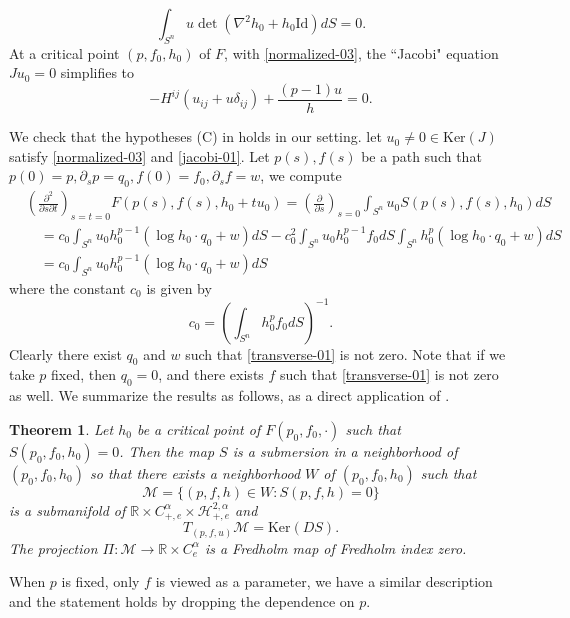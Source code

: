 \documentclass[reqno]{amsart}
\theoremstyle{remark}
\def\p{\partial}
\def\R{\mathbb{R}}
\def\cH{{\mathcal H}}
\def\cM{{\mathcal M}}
\theoremstyle{plain}
\newtheorem{thm}{Theorem}
\begin{document}
\begin{equation}\label{normalized-03}
\int_{S^n} u \det(\nabla^2 h_0+h_0\text{Id}) dS=0.
\end{equation}
At a critical point $(p, f_0, h_0)$ of $F$, with \eqref{normalized-03}, the ``Jacobi" equation $Ju_0=0$ simplifies to 
\begin{equation}\label{jacobi-01}
    -H^{ij}(u_{ij}+u\delta_{ij})+\frac{(p-1)u}{h}=0.
\end{equation}

We check that the hypotheses (C) in \cite[Theorem 1.2]{White91} holds in our setting.  
 let $u_0\neq 0\in \text{Ker}(J)$ satisfy \eqref{normalized-03} and \eqref{jacobi-01}. 
Let $p(s), f(s)$ be a path such that $p(0)=p, \p_sp=q_0,  f(0)=f_0, \p_sf=w$, we compute
\begin{equation}\label{transverse-01}
\begin{split}
    &\left(\frac{\p^2}{\p s\p t}\right)_{s=t=0} F(p(s), f(s), h_0+tu_0)=\left(\frac{\p}{\p s}\right)_{s=0} \int_{S^n} u_0 S(p(s), f(s), h_0) dS\\
    &\quad=c_0\int_{S^n} u_0 h_0^{p-1}(\log h_0\cdot q_0+w)dS-c_0^2\int_{S^n} u_0 h_0^{p-1}f_0dS \int_{S^n} h_0^p(\log h_0\cdot q_0+w)dS\\
    &\quad=c_0\int_{S^n} u_0 h_0^{p-1}(\log h_0\cdot q_0+w)dS
    \end{split}
\end{equation}
where the constant $c_0$ is given by
\[
c_0=\left(\int_{S^n} h_0^p f_0 dS\right)^{-1}.
\]
Clearly there exist $q_0$ and $w$ such that  \eqref{transverse-01} is not zero. Note that if we take $p$ fixed, then $q_0=0$, and there exists $f$ such that \eqref{transverse-01} is not zero as well.  We summarize the results as follows, as a direct application of \cite[Theorem 1.2]{White91}.

\begin{thm}Let $h_0$ be a critical point of $F(p_0, f_0, \cdot)$ such that $S(p_0, f_0, h_0)=0$. Then the map $S$ is a submersion in a neighborhood of $(p_0, f_0, h_0)$ so that there exists a neighborhood $W$ of $(p_0, f_0, h_0)$ such that
\[
\cM=\{(p, f, h)\in W: S(p, f, h)=0\}
\]
is a submanifold of $\R\times  C^{\alpha}_{+, e}\times \cH^{2, \alpha}_{+, e}$ and
\[
T_{(p, f, u)}\cM=\text{Ker} (DS).
\]
The projection $\Pi: \cM\rightarrow \R\times  C^{\alpha}_{e}$ is a Fredholm map of Fredholm index zero. 
\end{thm}

When $p$ is fixed, only $f$ is viewed as a parameter, we have a similar description and  the statement holds by dropping the dependence on $p$. 
\end{document}
